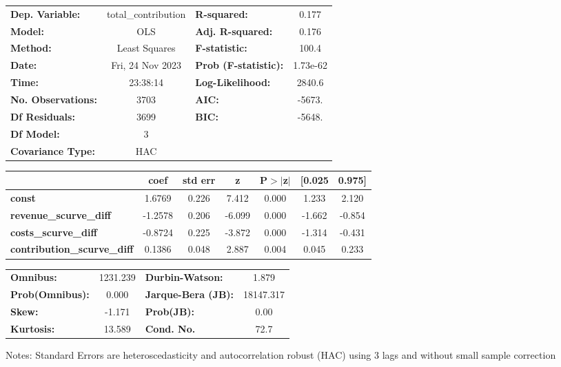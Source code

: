\begin{center}
\begin{tabular}{lclc}
\toprule
\textbf{Dep. Variable:}             & total\_contribution & \textbf{  R-squared:         } &     0.177   \\
\textbf{Model:}                     &         OLS         & \textbf{  Adj. R-squared:    } &     0.176   \\
\textbf{Method:}                    &    Least Squares    & \textbf{  F-statistic:       } &     100.4   \\
\textbf{Date:}                      &   Fri, 24 Nov 2023  & \textbf{  Prob (F-statistic):} &  1.73e-62   \\
\textbf{Time:}                      &       23:38:14      & \textbf{  Log-Likelihood:    } &    2840.6   \\
\textbf{No. Observations:}          &          3703       & \textbf{  AIC:               } &    -5673.   \\
\textbf{Df Residuals:}              &          3699       & \textbf{  BIC:               } &    -5648.   \\
\textbf{Df Model:}                  &             3       & \textbf{                     } &             \\
\textbf{Covariance Type:}           &         HAC         & \textbf{                     } &             \\
\bottomrule
\end{tabular}
\begin{tabular}{lcccccc}
                                    & \textbf{coef} & \textbf{std err} & \textbf{z} & \textbf{P$> |$z$|$} & \textbf{[0.025} & \textbf{0.975]}  \\
\midrule
\textbf{const}                      &       1.6769  &        0.226     &     7.412  &         0.000        &        1.233    &        2.120     \\
\textbf{revenue\_scurve\_diff}      &      -1.2578  &        0.206     &    -6.099  &         0.000        &       -1.662    &       -0.854     \\
\textbf{costs\_scurve\_diff}        &      -0.8724  &        0.225     &    -3.872  &         0.000        &       -1.314    &       -0.431     \\
\textbf{contribution\_scurve\_diff} &       0.1386  &        0.048     &     2.887  &         0.004        &        0.045    &        0.233     \\
\bottomrule
\end{tabular}
\begin{tabular}{lclc}
\textbf{Omnibus:}       & 1231.239 & \textbf{  Durbin-Watson:     } &     1.879  \\
\textbf{Prob(Omnibus):} &   0.000  & \textbf{  Jarque-Bera (JB):  } & 18147.317  \\
\textbf{Skew:}          &  -1.171  & \textbf{  Prob(JB):          } &      0.00  \\
\textbf{Kurtosis:}      &  13.589  & \textbf{  Cond. No.          } &      72.7  \\
\bottomrule
\end{tabular}
\end{center}

Notes: \newline
 [1] Standard Errors are heteroscedasticity and autocorrelation robust (HAC) using 3 lags and without small sample correction
